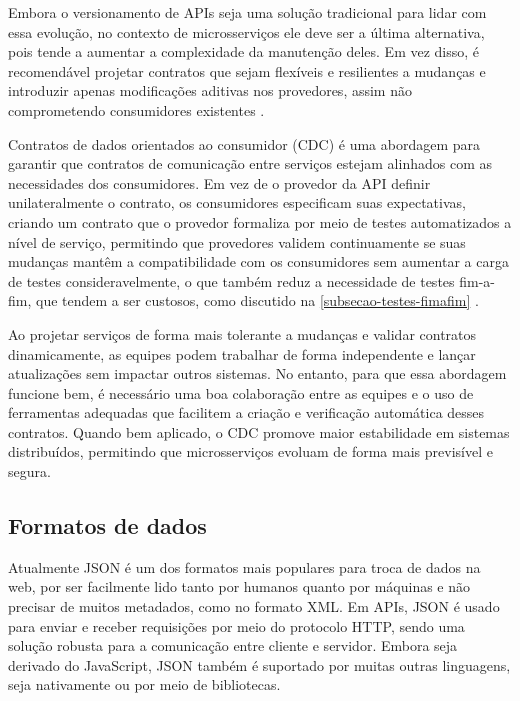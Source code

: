 Embora o versionamento de APIs seja uma solução tradicional para lidar com essa evolução, no contexto de microsserviços ele deve ser a última alternativa, pois tende a aumentar a complexidade da manutenção deles. Em vez disso, é recomendável projetar contratos que sejam flexíveis e resilientes a mudanças e introduzir apenas modificações aditivas nos provedores, assim não comprometendo consumidores existentes \cite{martin-fowler-microservices}.

Contratos de dados orientados ao consumidor (CDC) é uma abordagem para garantir que contratos de comunicação entre serviços estejam alinhados com as necessidades dos consumidores. Em vez de o provedor da API definir unilateralmente o contrato, os consumidores especificam suas expectativas, criando um contrato que o provedor formaliza por meio de testes automatizados a nível de serviço, permitindo que provedores validem continuamente se suas mudanças mantêm a compatibilidade com os consumidores sem aumentar a carga de testes consideravelmente, o que também reduz a necessidade de testes fim-a-fim, que tendem a ser custosos, como discutido na \autoref{subsecao-testes-fimafim} \cite{consumer-driven-contracts,livro-building-microservices}.

Ao projetar serviços de forma mais tolerante a mudanças e validar contratos dinamicamente, as equipes podem trabalhar de forma independente e lançar atualizações sem impactar outros sistemas. No entanto, para que essa abordagem funcione bem, é necessário uma boa colaboração entre as equipes e o uso de ferramentas adequadas que facilitem a criação e verificação automática desses contratos. Quando bem aplicado, o CDC promove maior estabilidade em sistemas distribuídos, permitindo que microsserviços evoluam de forma mais previsível e segura. \cite{consumer-driven-contracts}

\subsection{Formatos de dados}\label{subsecao-trocas-de-dados}
Atualmente JSON é um dos formatos mais populares para troca de dados na web, por ser facilmente lido tanto por humanos quanto por máquinas e não precisar de muitos metadados, como no formato XML. Em APIs, JSON é usado para enviar e receber requisições por meio do protocolo HTTP, sendo uma solução robusta para a comunicação entre cliente e servidor. Embora seja derivado do JavaScript, JSON também é suportado por muitas outras linguagens, seja nativamente ou por meio de bibliotecas. \cite{json_bourhis_2020}

